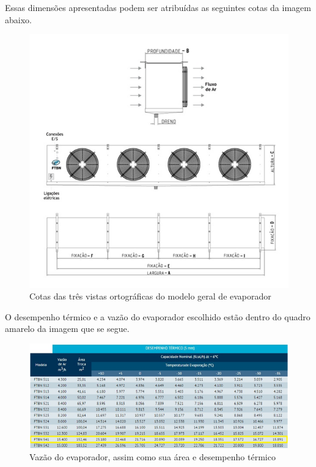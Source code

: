 Essas dimensões apresentadas podem ser atribuídas as seguintes cotas da imagem abaixo.
\begin{figure}[!htbp]
	 \centering
	  \includegraphics[scale=1]{editaveis/figuras/cotas_evaporador}
	  \caption[Cotas evaporador]{Cotas das três vistas ortográficas do modelo geral de evaporador \footnotemark}
	  \label{cota_evaporador}
	\end{figure}	   
	\FloatBarrier
	
O desempenho térmico e a vazão do evaporador escolhido estão dentro do quadro amarelo da imagem que se segue.
\begin{figure}[!htbp]
	 \centering
	  \includegraphics[scale=1]{editaveis/figuras/desenho_termico}
	  \caption[Vazão do evaporador]{Vazão do evaporador, assim como sua área e desempenho térmico \footnotemark}
	  \label{vazao_evaporador}
	\end{figure}	   
	\FloatBarrier
	
